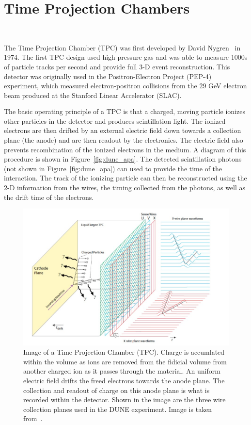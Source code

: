 \section{Time Projection Chambers}~\label{sec:tpcs}

The Time Projection Chamber (TPC) was first developed by David Nygren~\cite{lartpc:nygren} in 1974.
The first TPC design used high pressure gas and was able to measure 1000s of particle tracks per second and provide full 3-D event reconstruction.
This detector was originally used in the Positron-Electron Project (PEP-4) experiment, which measured electron-positron collisions from the 29 GeV electron beam produced at the Stanford Linear Accelerator (SLAC).

The basic operating principle of a TPC is that a charged, moving particle ionizes other particles in the detector and produces scintillation light.
The ionized electrons are then drifted by an external electric field down towards a collection plane (the anode) and are then readout by the electronics.
The electric field also prevents recombination of the ionized electrons in the medium. 
A diagram of this procedure is shown in Figure~\ref{fig:dune_apa}.
The detected scintillation photons (not shown in Figure~\ref{fig:dune_apa}) can used to provide the time of the interaction.
The track of the ionizing particle can then be reconstructed using the 2-D information from the wires, the timing collected from the photons, as well as the drift time of the electrons.

\begin{figure}[]
\centering
\includegraphics[width=\textwidth]{images/dune_tdrv12020_lartpc-sp.jpg}
\caption{Image of a Time Projection Chamber (TPC).
Charge is accumlated within the volume as ions are removed from the fidicial volume from another charged ion as it passes through the material.
An uniform electric field drifts the freed electrons towards the anode plane.
The collection and readout of charge on this anode plane is what is recorded within the detector.
Shown in the image are the three wire collection planes used in the DUNE experiment.
Image is taken from~\citep{DUNE_TDR_V1_Abi_2020}.}
\end{figure}~\label{fig:dune_apa}


